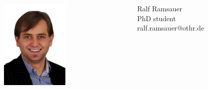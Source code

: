 \documentclass{beamer}
\begin{document}
\begin{frame}
\begin{minipage}[c]{1.0\linewidth}
	\end{minipage}
	\begin{minipage}[c]{1.0\linewidth}
		\begin{columns}
		\begin{column}{0.35\textwidth}
			\begin{center}
     		\includegraphics[width=0.5\textwidth]{pics/speakers_ralf.png}
			\end{center}
		\end{column}
		\begin{column}{1.0\textwidth}
			Ralf Ramsauer\\PhD student \\ralf.ramsauer@othr.de
		\end{column}
		\end{columns}
	\end{minipage}
	\begin{minipage}[c]{1.0\linewidth}
		\begin{columns}
		\begin{column}{0.35\textwidth}
			\begin{center}

\end{center}
\end{column}
\end{columns}
\end{minipage}
\end{frame}
\end{document}
